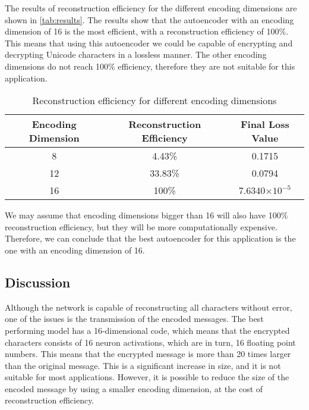 The results of reconstruction efficiency for the different encoding dimensions are shown in \autoref{tab:results}. The results show that the autoencoder with an encoding dimension of 16 is the most efficient, with a reconstruction efficiency of 100\%. This means that using this autoencoder we could be capable of encrypting and decrypting Unicode characters in a lossless manner. The other encoding dimensions do not reach 100\% efficiency, therefore they are not suitable for this application.

\begin{table}[h]
    \centering
    \begin{tabular}{|c|c|c|}
        \hline
        Encoding Dimension & Reconstruction Efficiency & Final Loss Value      \\
        \hline
        8                  & 4.43\%                    & 0.1715                \\
        12                 & 33.83\%                   & 0.0794                \\
        16                 & 100\%                     & 7.6340$\times10^{-5}$ \\
        \hline
    \end{tabular}
    \caption{Reconstruction efficiency for different encoding dimensions}
    \label{tab:results}
\end{table}

We may assume that encoding dimensions bigger than 16 will also have 100\% reconstruction efficiency, but they will be more computationally expensive. Therefore, we can conclude that the best autoencoder for this application is the one with an encoding dimension of 16.

\subsection{Discussion}

Although the network is capable of reconstructing all characters without error, one of the issues is the transmission of the encoded messages. The best performing model has a 16-dimensional code, which means that the encrypted characters consists of 16 neuron activations, which are in turn, 16 floating point numbers. This means that the encrypted message is more than 20 times larger than the original message. This is a significant increase in size, and it is not suitable for most applications. However, it is possible to reduce the size of the encoded message by using a smaller encoding dimension, at the cost of reconstruction efficiency.

